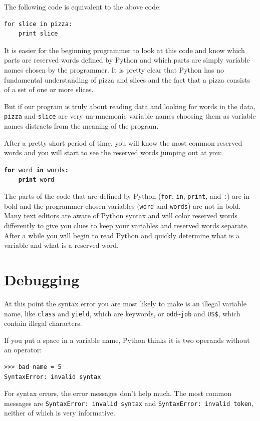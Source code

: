 \documentclass[10pt]{book}
\begin{document}
The following code is equivalent to the above code:

\beforeverb
\begin{verbatim}
for slice in pizza:
    print slice
\end{verbatim}
\afterverb
%
It is easier for the beginning programmer to look at this code and know which 
parts are reserved words defined by Python and which parts are simply variable
names chosen by the programmer.  It is pretty clear that Python has no fundamental
understanding of pizza and slices and the fact that a pizza consists of a set
of one or more slices.

But if our program is truly about reading data and looking for words in the data,
{\tt pizza} and {\tt slice} are very un-mnemonic variable names choosing them 
as variable names distracts from the meaning of the program.

After a pretty short period of time, you will know the most common reserved words
and you will start to see the reserved words jumping out at you:

{\tt {\bf for} word {\bf in} words{\bf :}\\
\verb"    "{\bf print} word }

The parts of the code that are defined by 
Python ({\tt for}, {\tt in}, {\tt print}, and {\tt :}) are in bold
and the programmer chosen variables ({\tt word} and {\tt words}) are not in bold.  
Many text editors are aware of Python
syntax and will color reserved words differently to give you clues to keep 
your variables and reserved words separate.
After a while you will begin to read Python and quickly determine what
is a variable and what is a reserved word.

\section{Debugging}

At this point the syntax error you are most likely to make is
an illegal variable name, like {\tt class} and {\tt yield}, which
are keywords, or \verb"odd~job" and \verb"US$", which contain
illegal characters.


If you put a space in a variable name, Python thinks it is two
operands without an operator:

\beforeverb
\begin{verbatim}
>>> bad name = 5
SyntaxError: invalid syntax
\end{verbatim}
\afterverb
%
For syntax errors, the error messages don't help much.
The most common messages are {\tt SyntaxError: invalid syntax} and
{\tt SyntaxError: invalid token}, neither of which is very informative.
\end{document}

